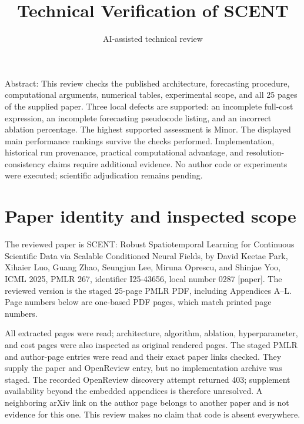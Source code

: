 \documentclass[10pt]{article}
\title{Technical Verification of SCENT}
\author{AI-assisted technical review}
\date{}
\begin{document}
\maketitle
Abstract: This review checks the published architecture, forecasting procedure, computational arguments, numerical tables, experimental scope, and all 25 pages of the supplied paper. Three local defects are supported: an incomplete full-cost expression, an incomplete forecasting pseudocode listing, and an incorrect ablation percentage. The highest supported assessment is Minor. The displayed main performance rankings survive the checks performed. Implementation, historical run provenance, practical computational advantage, and resolution-consistency claims require additional evidence. No author code or experiments were executed; scientific adjudication remains pending.\par
\section*{Paper identity and inspected scope}
The reviewed paper is SCENT: Robust Spatiotemporal Learning for Continuous Scientific Data via Scalable Conditioned Neural Fields, by David Keetae Park, Xihaier Luo, Guang Zhao, Seungjun Lee, Miruna Oprescu, and Shinjae Yoo, ICML 2025, PMLR 267, identifier I25-43656, local number 0287 [paper]. The reviewed version is the staged 25-page PMLR PDF, including Appendices A–L. Page numbers below are one-based PDF pages, which match printed page numbers.\par
All extracted pages were read; architecture, algorithm, ablation, hyperparameter, and cost pages were also inspected as original rendered pages. The staged PMLR and author-page entries were read and their exact paper links checked. They supply the paper and OpenReview entry, but no implementation archive was staged. The recorded OpenReview discovery attempt returned 403; supplement availability beyond the embedded appendices is therefore unresolved. A neighboring arXiv link on the author page belongs to another paper and is not evidence for this one. This review makes no claim that code is absent everywhere.\par
\end{document}
